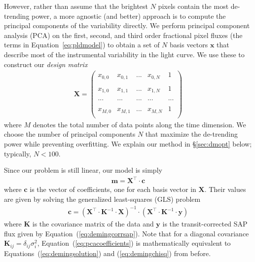 \documentclass[]{emulateapj}
\begin{document}
However, rather than assume that the brightest $N$ pixels contain the most
de-trending power, a more agnostic (and better) approach is to compute the principal components of the
variability directly. We perform principal component analysis (PCA) on the first,
second, and third order fractional pixel fluxes (the terms in Equation~\ref{eq:pldmodel})
to obtain a set of $N$ basis vectors $\mathbf{x}$ that describe most of the instrumental
variability in the light curve. We use these to construct our \emph{design matrix} 
\begin{align}
\label{eq:designmatrix}
\mathbf{X} =  \begin{pmatrix}
              x_{0,0} & x_{0,1} & ... & x_{0,N} & 1\\
              \\
              x_{1,0} & x_{1,1} & ... & x_{1,N} & 1\\
              \\
              ... & ... & ... & ... & ...\\
              \\
              x_{M,0} & x_{M,1} & ... & x_{M,N} & 1\\
              \end{pmatrix}
\end{align}
where $M$ denotes the total number of data points along the time dimension. We choose
the number of principal components $N$ that maximize the de-trending power while preventing
overfitting. We explain our method in \S\ref{sec:dmopt} below; typically, $N < 100$.

Since our problem is still linear, our model is simply
\begin{align}
\label{eq:pcamodel}
\mathbf{m} = \mathbf{X}^\top \cdot \mathbf{c}
\end{align}
where $\mathbf{c}$ is the vector of coefficients, one for each basis vector in $\mathbf{X}$.
Their values are given by solving the generalized least-squares (GLS) problem
\begin{align}
\label{eq:pcacoefficients}
\mathbf{c} = \left(\mathbf{X}^\top \cdot \mathbf{K}^{-1} \cdot \mathbf{X}\right)^{-1} \cdot \left(\mathbf{X}^\top \cdot \mathbf{K}^{-1} \cdot \mathbf{y}\right)
\end{align}
where $\mathbf{K}$ is the covariance matrix of the data and $\mathbf{y}$ is the transit-corrected
SAP flux given by Equation~(\ref{eq:demingcorrsap}). Note that for a diagonal covariance
$\mathbf{K}_{ij} = \delta_{ij}\sigma_i^2$, Equation~(\ref{eq:pcacoefficients}) is
mathematically equivalent to Equations~(\ref{eq:demingsolution}) and 
(\ref{eq:demingchisq}) from before.
\end{document}
